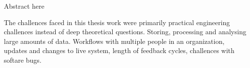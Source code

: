\makecoverpage
\makecopyrightpage

\begin{abstractpage}[english]
Abstract here
\end{abstractpage}

The challences faced in this thesis work were primarily practical engineering challences instead of deep theoretical questions.
Storing, processing and analysing large amounts of data.
Workflows with multiple people in an organization, updates and changes to live system, length of feedback cycles, challences with softare bugs.

\newpage

\setcounter{tocdepth}{2}
\thesistableofcontents
